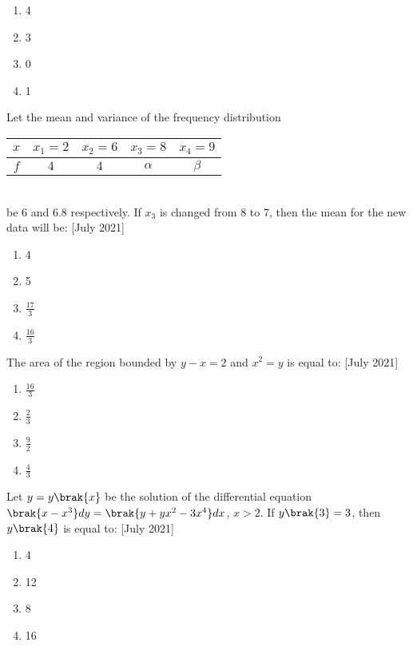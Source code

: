 \begin{enumerate}
    \item 4
    \item 3
    \item 0
    \item 1 \\
\end{enumerate}
 \item Let the mean and variance of the frequency distribution
 \begin{table}[h!]
 \centering
	 \begin{tabular}{|c|c|c|c|c|}
\hline
$x$ & $x_1 = 2$ & $x_2 = 6$ & $x_3 = 8$ & $x_4 = 9$ \\
\hline
$f$ & $4$ & $4$ & $\alpha$ & $\beta$ \\
\hline
\end{tabular}
\end{table} \\
be 6 and 6.8 respectively. If $x_3$ is changed from 8 to 7, then the mean for the new data will be: \hfill[July 2021]
 \begin{enumerate}
     \item 4
     \item 5
     \item $\frac{17}{3}$
     \item $\frac{16}{3}$\\
 \end{enumerate}
\item The area of the region bounded by $y - x = 2$ and $x^2 = y$ is equal to: \hfill[July 2021]
\begin{enumerate}
     \item $\frac{16}{3}$
     \item $\frac{2}{3}$
     \item $\frac{9}{2}$
     \item $\frac{4}{3}$\\
 \end{enumerate}
\item Let $y = y\brak{x}$ be the solution of the differential equation $\brak{x - x^3}dy = \brak{y + yx^2 - 3x^4}dx$, $x > 2$. If $y\brak{3} = 3$, then $y\brak{4}$ is equal to: \hfill[July 2021]
\begin{enumerate}
    \item 4
    \item 12
    \item 8
    \item 16\\
\end{enumerate}
